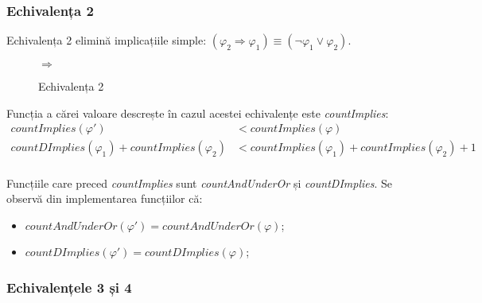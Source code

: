 \subsubsection{Echivalența 2}

Echivalența 2 elimină implicațiile simple: $(\varphi_2 \Rightarrow \varphi_1) \equiv (\neg \varphi_1 \lor \varphi_2)$.

\begin{figure}[H]
\caption{Echivalența 2}
\centering
{}
  $\Rightarrow$ %
  
\end{figure}

Funcția a cărei valoare descrește în cazul acestei echivalențe este \textit{countImplies}:
\begin{align*}
	countImplies(\varphi') &< countImplies(\varphi) \\
	countDImplies(\varphi_1) + countImplies(\varphi_2) &< countImplies(\varphi_1) + countImplies(\varphi_2) + 1 \\
\end{align*} 

Funcțiile care preced \textit{countImplies} sunt \textit{countAndUnderOr} și \textit{countDImplies}. Se observă din implementarea funcțiilor că: 
\begin{itemize}
\item $countAndUnderOr(\varphi') = countAndUnderOr(\varphi)$;
\item $countDImplies(\varphi') = countDImplies(\varphi)$;
\end{itemize} 

\subsubsection{Echivalențele 3 și 4}

